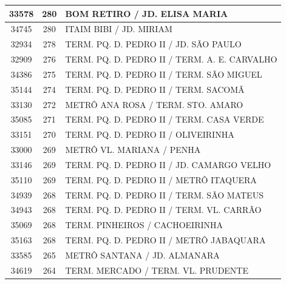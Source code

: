 \documentclass[
	12pt,				%
	oneside,			%
	a4paper,			%
	english,			%
	brazil				%
	]{abntex2ppgsi}
\begin{document}
\begin{apendicesenv}
\begin{longtable}{c|c|p{7cm}}
    33578 & 280   & BOM RETIRO / JD. ELISA MARIA \\
\hline

    34745 & 280   & ITAIM BIBI / JD. MIRIAM \\
\hline

    32934 & 278   & TERM. PQ. D. PEDRO II / JD. SÃO PAULO \\
\hline

    32909 & 276   & TERM. PQ. D. PEDRO II / TERM. A. E. CARVALHO \\
\hline

    34386 & 275   & TERM. PQ. D. PEDRO II / TERM. SÃO MIGUEL \\
\hline

    35144 & 274   & TERM. PQ. D. PEDRO II / TERM. SACOMÃ \\
\hline

    33130 & 272   & METRÔ ANA ROSA / TERM. STO. AMARO \\
\hline

    35085 & 271   & TERM. PQ. D. PEDRO II / TERM. CASA VERDE \\
\hline

    33151 & 270   & TERM. PQ. D. PEDRO II / OLIVEIRINHA \\
\hline

    33000 & 269   & METRÔ VL. MARIANA / PENHA \\
\hline

    33146 & 269   & TERM. PQ. D. PEDRO II / JD. CAMARGO VELHO \\
\hline

    35110 & 269   & TERM. PQ. D. PEDRO II / METRÔ ITAQUERA \\
\hline

    34939 & 268   & TERM. PQ. D. PEDRO II / TERM. SÃO MATEUS \\
\hline

    34943 & 268   & TERM. PQ. D. PEDRO II / TERM. VL. CARRÃO \\
\hline

    35069 & 268   & TERM. PINHEIROS / CACHOEIRINHA \\
\hline

    35163 & 268   & TERM. PQ. D. PEDRO II / METRÔ JABAQUARA \\
\hline

    33585 & 265   & METRÔ SANTANA / JD. ALMANARA \\
\hline

    34619 & 264   & TERM. MERCADO / TERM. VL. PRUDENTE \\
\hline


\end{longtable}
\end{apendicesenv}
\end{document}
